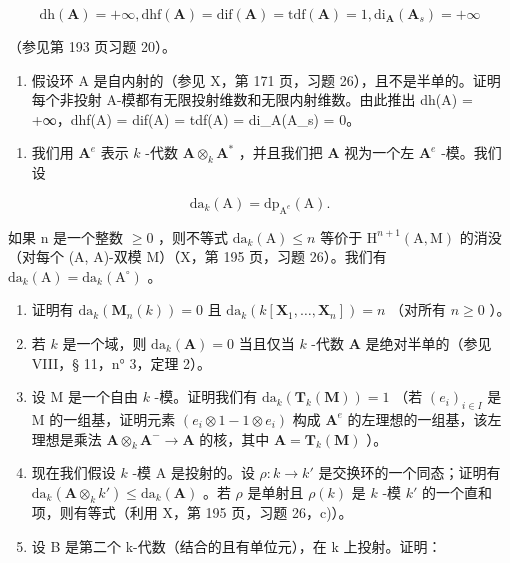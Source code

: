 \[
\mathrm{dh} (\mathbf {A}) = + \infty , \mathrm{dhf} (\mathbf {A}) = \mathrm{dif} (\mathbf {A}) = \mathrm{tdf} (\mathbf {A}) = 1, \mathrm{di} _ {\mathbf {A}} (\mathbf {A} _ {s}) = + \infty
\]

（参见第 193 页习题 20）。

\begin{enumerate}
\def\labelenumi{\alph{enumi})}
\setcounter{enumi}{3}
\tightlist
\item
  假设环 A 是自内射的（参见 X，第 171 页，习题 26），且不是半单的。证明每个非投射 A-模都有无限投射维数和无限内射维数。由此推出 dh(A) = +∞，dhf(A) = dif(A) = tdf(A) = di\_A(A\_s) = 0。
\end{enumerate}

\begin{enumerate}
\def\labelenumi{\arabic{enumi})}
\setcounter{enumi}{24}
\tightlist
\item
  我们用 \(\mathbf{A}^e\) 表示 \(k\) -代数 \(\mathbf{A} \otimes_k \mathbf{A}^*\) ，并且我们把 \(\mathbf{A}\) 视为一个左 \(\mathbf{A}^e\) -模。我们设
\end{enumerate}

\[
\mathrm{da} _ {k} (\mathrm{A}) = \mathrm{dp} _ {\mathrm{A} ^ {e}} (\mathrm{A}).
\]

如果 n 是一个整数 \(\geqslant0\) ，则不等式 \(\mathrm{da}_{k}(\mathrm{A})\leqslant n\) 等价于 \(\mathrm{H}^{n+1}(\mathrm{A},\mathrm{M})\) 的消没（对每个 (A, A)-双模 M）（X，第 195 页，习题 26）。我们有 \(\mathrm{da}_{k}(\mathrm{A})=\mathrm{da}_{k}(\mathrm{A}^{\circ})\) 。

\begin{enumerate}
\def\labelenumi{\alph{enumi})}
\item
  证明有 \(\mathrm{da}_k(\mathbf{M}_n(k)) = 0\) 且 \(\mathrm{da}_k(k[\mathbf{X}_1, \ldots, \mathbf{X}_n]) = n\) （对所有 \(n \geqslant 0\) ）。
\item
  若 \(k\) 是一个域，则 \(\mathrm{da}_{k}(\mathbf{A}) = 0\) 当且仅当 \(k\) -代数 \(\mathbf{A}\) 是绝对半单的（参见 VIII，§ 11，n° 3，定理 2）。
\item
  设 M 是一个自由 \(k\) -模。证明我们有 \(\mathrm{da}_{k}(\mathbf{T}_{k}(\mathbf{M})) = 1\) （若 \((e_{i})_{i \in I}\) 是 M 的一组基，证明元素 \((e_{i} \otimes 1 - 1 \otimes e_{i})\) 构成 \(\mathbf{A}^{e}\) 的左理想的一组基，该左理想是乘法 \(\mathbf{A} \otimes_{k} \mathbf{A}^{-} \to \mathbf{A}\) 的核，其中 \(\mathbf{A} = \mathbf{T}_{k}(\mathbf{M})\) ）。
\item
  现在我们假设 \(k\) -模 A 是投射的。设 \(\rho: k \to k'\) 是交换环的一个同态；证明有 \(\mathrm{da}_k(\mathbf{A} \otimes_k k') \leqslant \mathrm{da}_k(\mathbf{A})\) 。若 \(\rho\) 是单射且 \(\rho(k)\) 是 \(k\) -模 \(k'\) 的一个直和项，则有等式（利用 X，第 195 页，习题 26，c)）。
\item
  设 B 是第二个 k-代数（结合的且有单位元），在 k 上投射。证明：
\end{enumerate}

